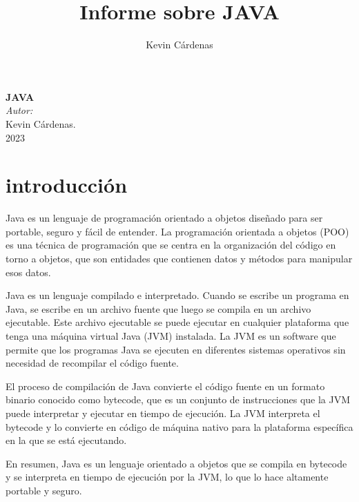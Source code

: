 \documentclass{article}
\title{Informe sobre JAVA}
\author{Kevin Cárdenas}
\begin{document}
\begin{titlepage}
    \begin{center}
        {\Huge \textbf{JAVA}}
        \\[18cm]

        \large\emph{Autor:}\\
        Kevin Cárdenas.
        \\[1cm]
        {\large 2023}
    \end{center}
\end{titlepage}

\newpage
\tableofcontents
\newpage
\section{introducción}
Java es un lenguaje de programación orientado a objetos diseñado para ser portable, seguro y fácil de entender. La programación orientada a objetos (POO) es una técnica de programación que se centra en la organización del código en torno a objetos, que son entidades que contienen datos y métodos para manipular esos datos.

Java es un lenguaje compilado e interpretado. Cuando se escribe un programa en Java, se escribe en un archivo fuente que luego se compila en un archivo ejecutable. Este archivo ejecutable se puede ejecutar en cualquier plataforma que tenga una máquina virtual Java (JVM) instalada. La JVM es un software que permite que los programas Java se ejecuten en diferentes sistemas operativos sin necesidad de recompilar el código fuente.

El proceso de compilación de Java convierte el código fuente en un formato binario conocido como bytecode, que es un conjunto de instrucciones que la JVM puede interpretar y ejecutar en tiempo de ejecución. La JVM interpreta el bytecode y lo convierte en código de máquina nativo para la plataforma específica en la que se está ejecutando.

En resumen, Java es un lenguaje orientado a objetos que se compila en bytecode y se interpreta en tiempo de ejecución por la JVM, lo que lo hace altamente portable y seguro.
\end{document}
